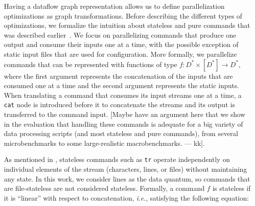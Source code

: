 \documentclass[letterpaper,twocolumn,10pt]{article}
\newcommand{\eg}{{\em e.g.}, }
\newcommand{\ie}{{\em i.e.}, }
\newcommand{\ttt}[1]{\texttt{\small #1}}
\newcommand{\nv}[1]{[{\color{cyan}#1 --- nv}]}
\newcommand{\kk}[1]{[{\color{magenta}#1 --- kk}]}
\newcommand{\kstar}{^{\textstyle *}}
\begin{document}

Having a dataflow graph representation allows us to define
parallelization optimizations as graph transformations. Before
describing the different types of optimizations, we formalize the
intuition about stateless and pure commands that was described
earlier~. We focus on parallelizing commands that produce one
output and consume their inputs one at a time, with the possible
exception of static input files that are used for configuration. More
formally, we parallelize commands that can be represented with
functions of type $f : D\kstar \times [D\kstar] \to D\kstar$, where
the first argument represents the concatenation of the inputs that are
consumed one at a time and the second argument represents the static
inputs. When translating a command that consumes its input streams one
at a time, a \ttt{cat} node is introduced before it to concatenate the
streams and its output is transferred to the command input. \kk{Maybe
  have an argument here that we show in the evaluation that handling
  these commands is adequate for a big variety of data processing
  scripts (and most stateless and pure commands), from several
  microbenchmarks to some large-realistic macrobenchmarks.}.


As mentioned in , stateless commands such as \ttt{tr} operate
independently on individual elements of the stream (characters, lines,
or files) without maintaining any state. In this work, we consider
lines as the data quantum, so commands that are file-stateless are not
considered stateless. Formally, a command $f$ is stateless if it is
``linear'' with respect to concatenation, \ie satisfying the following
equation:
\end{document}
